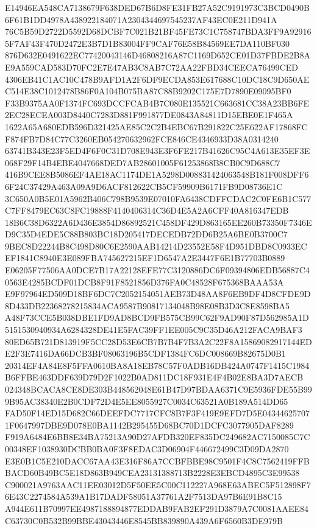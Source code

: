 \documentclass[UTF8,fontset=fandol,zihao=-4,a4paper]{ctexart}
\begin{document}
{{E14946EA548CA7138679F638DED67B6D8FE31FB27A52C9191973C3BCD0490B6F61B1DD4978A438922184071A2304344697545237AF43EC0E211D941A
76C5B59D2722D5592D68DCBF7C021B21BF45FE73C1C758747BDA3FF9A929165F7AF43F470D2472E3B7D1B83004FF9CAF76E58B84569EE7DA110BF030
876D632E0491622EC77420043146D46808216A87C1169D652CE01D37FBDE2B8AE9A559CAD583D70FC2E7E47AB3C8AB7C72AA22FBD34CEECA76499CED
4306EB41C1AC10C478B9AFD1A2F6DF9ECDA853E617688C10DC18C9D650AEC514E38C1012478B86F0A104B075BA87C88B9202C175E7D7890E09095BF0
F33B9375AA0F1374FC693DCCFCAB4B7C080E135521C663681CC38A23BB6FE2EC28ECEA003D8440C7283D881F991877DE0843A84811D15EBE0E1F465A
1622A65A680EDB596D321425AE85C2C2B4EBC67B291822C25E622AF17868FCF874FB7D84C77C3260EB054270632962FCE846CE4346933D38A0314240
63741B343E23F5ED4F6F0C31D708E943E3F6FE217B41626C95C4A613E35EF3E068F29F14B4EBE4047668DED7AB28601005F61253868B8CB0C9D688C7
416B9CEE8B5086EF4AE18AC1174DE1A5298D008831424063548B181F008DFF66F24C37429A463A09A9D6ACF812622CB5CF59909B6171FB9D08736E1C
3C650A0B5E01A5962B406C798B9539E07010FA6438CDFFCDAC2C0FE6B1C577C7FF8479EC63C8FC19888F4140406314C36D4E5A2A6CFF40A816347EDB
18B6C38D6322A6D436E3854D86892521C458DF429D863165EE260B73350F7346ED9C35D4EDE5C88B803BC18D205417DECEDB72DD6B25A6BE0B3700C7
9BEC8D22244B8C498D80C6E2590AAB14214D23552E58F4D951DBD8C0933ECEF1841C8940E3E089FBA745627215EF1D6547A2E3447F6E1B77703B0889
E06205F77506AA0DCE7B17A22128EFE77C3120886DC6F09394806EDB56887C40563E4285BCDF01DCB8F91F8521856D376FA0C48528F675368BAAA53A
E9F97964ED509D18BF6DC7C2052154051AEB73D48AA8F6EB9DF4D8CFDE9D8D433DB22368278215834ACA9587B90817134048B98E08B3D3C8E8598BA5
A48F73CCE5B038DBE1FD9AD8BCD9FB575CB99C62F9AD90F87D562985A1D5151530940934A6284328DE41E5FAC39FF1EE005C9C35D46A212FACA9BAF3
80ED65B721D813919F5CC28D53E6CB7B7B4F7B3A2C22F8A15869082917144EDE2F3E7416DA66DCB3BF08063196B5CDF1384FC6DC008669B82675D0B1
20314EF4A84E8F5FFA0610BA8A18EB78C57F0ADB16DB424A0747F1415C1984B6FFBE463DDF639D79D2F1022B0AD811DC18F931E4F4B02E8BA3D7AECB
024348BCACA8CE8DE303B448562048E61B47D97BDAA6371C9E5936FDE55B999B95AC38340E2B0CDF72D4E5EE8055927C0034C63521A0B189A514DD65
FAD50F14ED15D682C66DEEFDC7717CFC8B7F3F419E9EFD7D5E043446257071F0647997DBE9D078E0BA1142B295455D68BC70D1DCFC3077905DAF8289
F919A6484E6BB8E34BA75213A90D27AFDB320EF835DC249682AC7150085C7C00348EF1038930DCBB0BA0F3F8EDAC3D06904F446672499C3D09DA2870
E3E0B1C5E210DACC67AA43E316F86A7CCBFBBE98C9501F4C8C7562419FFBBACD60B49BC5E18D863B949CEA23131388713B2228E3EBCD4895C3E99538
C900021A9763AAC11EE03012D5F50EE5C00C112227A968E63ABEC5F512898F76E43C2274584A539A1B17DADF58051A37761A2F7513DA97B6E91B8C15
A944E611B70997EE4987188894877EDDAB9FAB2EF291D3879A7C0081AAEE84C63730C0B532B99BBE43043446E8545BB839890A439A6F6560B3DE979B
}}
\end{document}
